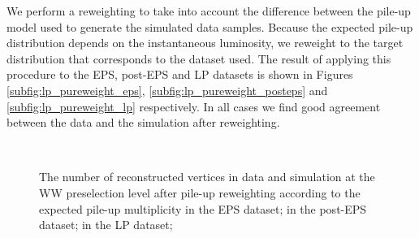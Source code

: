 
We perform a reweighting to take into account the difference 
between the pile-up model used to generate the simulated data samples.
Because the expected pile-up distribution depends on the instantaneous 
luminosity, we reweight to the target distribution that corresponds to 
the dataset used.
The result of applying this procedure to the EPS, post-EPS and LP datasets
is shown in Figures \ref{subfig:lp_pureweight_eps}, \ref{subfig:lp_pureweight_posteps}
and \ref{subfig:lp_pureweight_lp} respectively. 
In all cases we find good agreement between the data and the simulation
after reweighting.

\begin{figure}[!hbtp]
\centering
{}
\\
\caption{The number of reconstructed vertices in data and simulation 
at the WW preselection level after pile-up reweighting
according to the expected pile-up multiplicity
 in the EPS dataset;
 in the post-EPS dataset;
 in the LP dataset;
}
\label{fig:lp_ww0j_dilep}
\end{figure}

